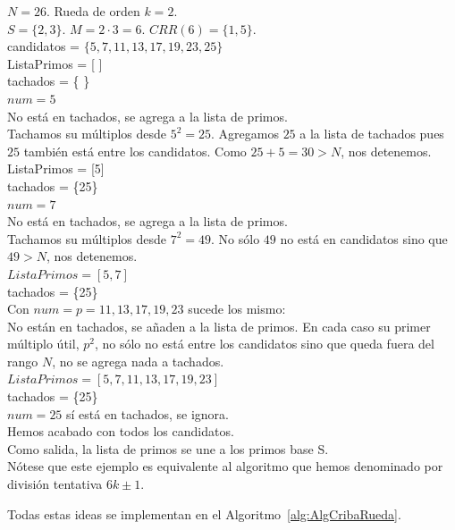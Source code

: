 \begin{ejemplo}
$N=26$. Rueda de orden $k=2$.\\
$S = \{2, 3\}$. $M = 2 \cdot 3 = 6$. $CRR(6) = \{1, 5\}$.\\
candidatos = $\{5, 7, 11, 13, 17, 19, 23, 25\}$ \\
ListaPrimos = [ ] \\
tachados = \{ \} \\
$num = 5$ \\
No está en tachados, se agrega a la lista de primos. \\
Tachamos su múltiplos desde $5^2 = 25$. Agregamos $25$ a la lista de tachados pues $25$ también está entre los candidatos. Como $25+5 = 30 > N$, nos detenemos. \\
ListaPrimos = [5] \\
tachados = \{25\} \\
$num = 7$ \\
No está en tachados, se agrega a la lista de primos. \\
Tachamos su múltiplos desde $7^2 = 49$. No sólo $49$ no está en candidatos sino que $49 > N$, nos detenemos. \\
$ListaPrimos = [5,7]$ \\
tachados = \{25\} \\
Con $num = p = 11, 13, 17, 19, 23$ sucede los mismo: \\
No están en tachados, se añaden a la lista de primos. En cada caso su primer múltiplo útil, $p^2$, no sólo no está entre los candidatos sino que queda fuera del rango $N$, no se agrega nada a tachados.\\
$ListaPrimos = [5,7, 11, 13, 17, 19, 23]$ \\
tachados = \{25\} \\
$num = 25$ sí está en tachados, se ignora. \\
Hemos acabado con todos los candidatos. \\
Como salida, la lista de primos se une a los primos base S. \\
Nótese que este ejemplo es equivalente al algoritmo que hemos denominado por división tentativa $6k \pm 1$.
\end{ejemplo}

Todas estas ideas se implementan en el Algoritmo~\ref{alg:AlgCribaRueda}.

